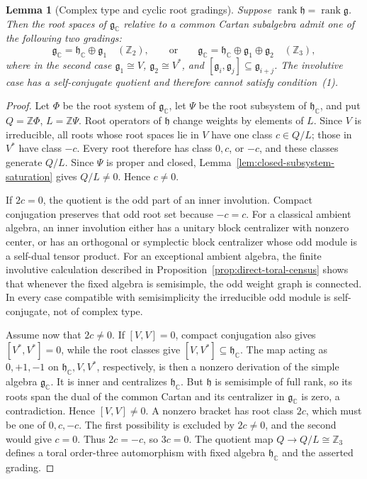 \documentclass[11pt]{article}
\newtheorem{lemma}[theorem]{Lemma}
\theoremstyle{remark}
\newcommand{\g}{\mathfrak g}
\newcommand{\h}{\mathfrak h}
\begin{document}
\begin{lemma}[Complex type and cyclic root gradings]
\label{lem:cyclic-root-grading}
Suppose \(\operatorname{rank}\h=\operatorname{rank}\g\).  Then the root
spaces of \(\g_{\mathbb C}\) relative to a common Cartan subalgebra admit
one of the following two gradings:
\[
 \g_{\mathbb C}=\h_{\mathbb C}\oplus\g_1
 \quad (\mathbb Z_2),
 \qquad\text{or}\qquad
 \g_{\mathbb C}=\h_{\mathbb C}\oplus\g_1\oplus\g_2
 \quad (\mathbb Z_3),
\]
where in the second case \(\g_1\cong V\), \(\g_2\cong V^*\), and
\([\g_i,\g_j]\subseteq\g_{i+j}\).  The involutive case has a
self-conjugate quotient and therefore cannot satisfy condition~\textup{(1)}.
\end{lemma}
\begin{proof}
Let \(\Phi\) be the root system of \(\g_{\mathbb C}\), let \(\Psi\) be the
root subsystem of \(\h_{\mathbb C}\), and put
\(Q=\mathbb Z\Phi\), \(L=\mathbb Z\Psi\).  Root operators of \(\h\) change
weights by elements of \(L\).  Since \(V\) is irreducible, all roots whose
root spaces lie in \(V\) have one class \(c\in Q/L\); those in \(V^*\)
have class \(-c\).  Every root therefore has class \(0,c\), or \(-c\), and
these classes generate \(Q/L\).  Since \(\Psi\) is proper and closed,
Lemma~\ref{lem:closed-subsystem-saturation} gives \(Q/L\ne0\).  Hence
\(c\ne0\).

If \(2c=0\), the quotient is the odd part of an inner involution.  Compact
conjugation preserves that odd root set because \(-c=c\).  For a classical
ambient algebra, an inner involution either has a unitary block centralizer
with nonzero center, or has an orthogonal or symplectic block centralizer whose
odd module is a self-dual tensor product.  For an exceptional ambient algebra,
the finite involutive calculation described in
Proposition~\ref{prop:direct-toral-census} shows that
whenever the fixed algebra is semisimple, the odd weight graph is connected.
In every case compatible with semisimplicity the irreducible odd module is
self-conjugate, not of complex type.

Assume now that \(2c\ne0\).  If \([V,V]=0\), compact conjugation also gives
\([V^*,V^*]=0\), while the root classes give
\([V,V^*]\subseteq\h_{\mathbb C}\).  The map acting as \(0,+1,-1\) on
\(\h_{\mathbb C},V,V^*\), respectively, is then a nonzero derivation of the
simple algebra \(\g_{\mathbb C}\).  It is inner and centralizes
\(\h_{\mathbb C}\).  But \(\h\) is semisimple of full rank, so its roots
span the dual of the common Cartan and its centralizer in \(\g_{\mathbb C}\)
is zero, a contradiction.  Hence \([V,V]\ne0\).  A nonzero bracket has root
class \(2c\), which must be one of \(0,c,-c\).  The first possibility is
excluded by \(2c\ne0\), and the second would give \(c=0\).  Thus
\(2c=-c\), so \(3c=0\).  The quotient map \(Q\to Q/L\cong\mathbb Z_3\)
defines a toral order-three automorphism with fixed algebra
\(\h_{\mathbb C}\) and the asserted grading.
\end{proof}
\end{document}
